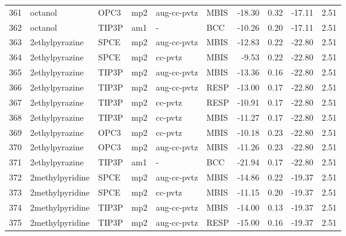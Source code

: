\begin{tabular}{llllllrrrr}
361 &                        octanol &       OPC3 &      mp2 &  aug-cc-pvtz &         MBIS & -18.30 &      0.32 &      -17.11 &     2.51 \\
362 &                        octanol &      TIP3P &      am1 &            - &          BCC & -10.26 &      0.20 &      -17.11 &     2.51 \\
363 &                 2ethylpyrazine &       SPCE &      mp2 &  aug-cc-pvtz &         MBIS & -12.83 &      0.22 &      -22.80 &     2.51 \\
364 &                 2ethylpyrazine &       SPCE &      mp2 &      cc-pvtz &         MBIS &  -9.53 &      0.22 &      -22.80 &     2.51 \\
365 &                 2ethylpyrazine &      TIP3P &      mp2 &  aug-cc-pvtz &         MBIS & -13.36 &      0.16 &      -22.80 &     2.51 \\
366 &                 2ethylpyrazine &      TIP3P &      mp2 &  aug-cc-pvtz &         RESP & -13.00 &      0.17 &      -22.80 &     2.51 \\
367 &                 2ethylpyrazine &      TIP3P &      mp2 &      cc-pvtz &         RESP & -10.91 &      0.17 &      -22.80 &     2.51 \\
368 &                 2ethylpyrazine &      TIP3P &      mp2 &      cc-pvtz &         MBIS & -11.27 &      0.17 &      -22.80 &     2.51 \\
369 &                 2ethylpyrazine &       OPC3 &      mp2 &      cc-pvtz &         MBIS & -10.18 &      0.23 &      -22.80 &     2.51 \\
370 &                 2ethylpyrazine &       OPC3 &      mp2 &  aug-cc-pvtz &         MBIS & -11.26 &      0.23 &      -22.80 &     2.51 \\
371 &                 2ethylpyrazine &      TIP3P &      am1 &            - &          BCC & -21.94 &      0.17 &      -22.80 &     2.51 \\
372 &                2methylpyridine &       SPCE &      mp2 &  aug-cc-pvtz &         MBIS & -14.86 &      0.22 &      -19.37 &     2.51 \\
373 &                2methylpyridine &       SPCE &      mp2 &      cc-pvtz &         MBIS & -11.15 &      0.20 &      -19.37 &     2.51 \\
374 &                2methylpyridine &      TIP3P &      mp2 &  aug-cc-pvtz &         MBIS & -14.00 &      0.13 &      -19.37 &     2.51 \\
375 &                2methylpyridine &      TIP3P &      mp2 &  aug-cc-pvtz &         RESP & -15.00 &      0.16 &      -19.37 &     2.51 \\

\end{tabular}

